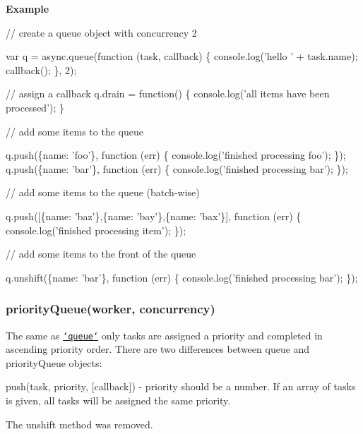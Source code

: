 {\bfseries Example}


\begin{DoxyCode}
\textcolor{comment}{// create a queue object with concurrency 2}

var q = async.queue(\textcolor{keyword}{function} (task, callback) \{
    console.log(\textcolor{stringliteral}{'hello '} + task.name);
    callback();
\}, 2);


\textcolor{comment}{// assign a callback}
q.drain = \textcolor{keyword}{function}() \{
    console.log(\textcolor{stringliteral}{'all items have been processed'});
\}

\textcolor{comment}{// add some items to the queue}

q.push(\{name: \textcolor{stringliteral}{'foo'}\}, \textcolor{keyword}{function} (err) \{
    console.log(\textcolor{stringliteral}{'finished processing foo'});
\});
q.push(\{name: \textcolor{stringliteral}{'bar'}\}, \textcolor{keyword}{function} (err) \{
    console.log(\textcolor{stringliteral}{'finished processing bar'});
\});

\textcolor{comment}{// add some items to the queue (batch-wise)}

q.push([\{name: \textcolor{stringliteral}{'baz'}\},\{name: \textcolor{stringliteral}{'bay'}\},\{name: \textcolor{stringliteral}{'bax'}\}], \textcolor{keyword}{function} (err) \{
    console.log(\textcolor{stringliteral}{'finished processing item'});
\});

\textcolor{comment}{// add some items to the front of the queue}

q.unshift(\{name: \textcolor{stringliteral}{'bar'}\}, \textcolor{keyword}{function} (err) \{
    console.log(\textcolor{stringliteral}{'finished processing bar'});
\});
\end{DoxyCode}






\label{_priorityQueue}%
 \subsubsection*{priority\+Queue(worker, concurrency)}

The same as \href{#queue}{\tt `queue`} only tasks are assigned a priority and completed in ascending priority order. There are two differences between {\ttfamily queue} and {\ttfamily priority\+Queue} objects\+:


\begin{DoxyItemize}
\item {\ttfamily push(task, priority, \mbox{[}callback\mbox{]})} -\/ {\ttfamily priority} should be a number. If an array of {\ttfamily tasks} is given, all tasks will be assigned the same priority.
\item The {\ttfamily unshift} method was removed. 


\end{DoxyItemize}


